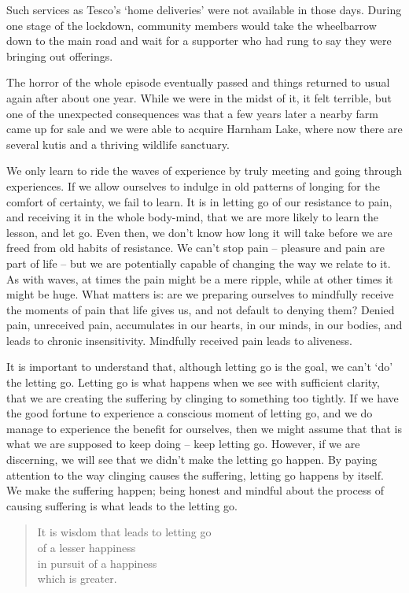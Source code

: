 Such services as Tesco's `home deliveries' were not available in those
days. During one stage of the lockdown, community members would take the
wheelbarrow down to the main road and wait for a supporter who had rung
to say they were bringing out offerings.

The horror of the whole episode eventually passed and things returned to
usual again after about one year. While we were in the midst of it, it
felt terrible, but one of the unexpected consequences was that a few
years later a nearby farm came up for sale and we were able to acquire
Harnham Lake, where now there are several kutis and a thriving wildlife
sanctuary.

We only learn to ride the waves of experience by truly meeting and going
through experiences. If we allow ourselves to indulge in old patterns of
longing for the comfort of certainty, we fail to learn. It is in letting
go of our resistance to pain, and receiving it in the whole body-mind,
that we are more likely to learn the lesson, and let go. Even then, we
don't know how long it will take before we are freed from old habits of
resistance. We can't stop pain -- pleasure and pain are part of life --
but we are potentially capable of changing the way we relate to it. As
with waves, at times the pain might be a mere ripple, while at other
times it might be huge. What matters is: are we preparing ourselves to
mindfully receive the moments of pain that life gives us, and not
default to denying them? Denied pain, unreceived pain, accumulates in
our hearts, in our minds, in our bodies, and leads to chronic
insensitivity. Mindfully received pain leads to aliveness.

It is important to understand that, although letting go is the goal, we
can't `do' the letting go. Letting go is what happens when we see with
sufficient clarity, that we are creating the suffering by clinging to
something too tightly. If we have the good fortune to experience a
conscious moment of letting go, and we do manage to experience the
benefit for ourselves, then we might assume that that is what we are
supposed to keep doing -- keep letting go. However, if we are
discerning, we will see that we didn't make the letting go happen. By
paying attention to the way clinging causes the suffering, letting go
happens by itself. We make the suffering happen; being honest and
mindful about the process of causing suffering is what leads to the
letting go.

\begin{quote}
  It is wisdom that leads to letting go\\
  of a lesser happiness\\
  in pursuit of a happiness\\
  which is greater.
\end{quote}

